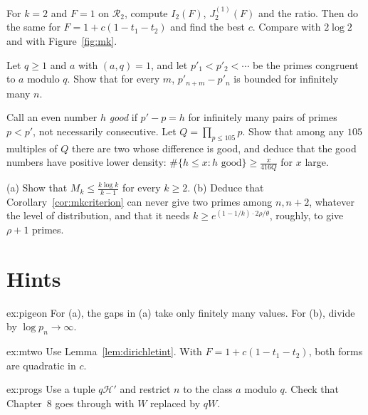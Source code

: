 \begin{exercise}[$\star$]\label{ex:mtwo}
For $k=2$ and $F=1$ on $\mathcal R_2$, compute $I_2(F)$, $J_2^{(1)}(F)$ and the ratio. Then do the same for $F=1+c(1-t_1-t_2)$ and find the best $c$. Compare with $2\log2$ and with Figure~\ref{fig:mk}.
\end{exercise}

\begin{exercise}[$\star\star$]\label{ex:progs}
Let $q\ge1$ and $a$ with $(a,q)=1$, and let $p'_1<p'_2<\cdots$ be the primes congruent to $a$ modulo $q$. Show that for every $m$, $p'_{n+m}-p'_n$ is bounded for infinitely many $n$.
\end{exercise}

\begin{exercise}[$\star\star$]\label{ex:gooddiff}
Call an even number $h$ \emph{good} if $p'-p=h$ for infinitely many pairs of primes $p<p'$, not necessarily consecutive. Let $Q=\prod_{p\le105}p$. Show that among any $105$ multiples of $Q$ there are two whose difference is good, and deduce that the good numbers have positive lower density: $\#\{h\le x:h\text{ good}\}\ge\frac x{416Q}$ for $x$ large.
\end{exercise}

\begin{exercise}[$\star\star\star$]\label{ex:upper}
(a) Show that $M_k\le\frac{k\log k}{k-1}$ for every $k\ge2$.
(b) Deduce that Corollary~\ref{cor:mkcriterion} can never give two primes among $n,n+2$, whatever the level of distribution, and that it needs $k\ge e^{(1-1/k)\cdot2\rho/\theta}$, roughly, to give $\rho+1$ primes.
\end{exercise}

\section{Hints}

\begin{hint}{ex:pigeon}
For (a), the gaps in (a) take only finitely many values. For (b), divide by $\log p_n\to\infty$.
\end{hint}

\begin{hint}{ex:mtwo}
Use Lemma~\ref{lem:dirichletint}. With $F=1+c(1-t_1-t_2)$, both forms are quadratic in $c$.
\end{hint}

\begin{hint}{ex:progs}
Use a tuple $q\mathcal H'$ and restrict $n$ to the class $a$ modulo $q$. Check that Chapter~8 goes through with $W$ replaced by $qW$.
\end{hint}

